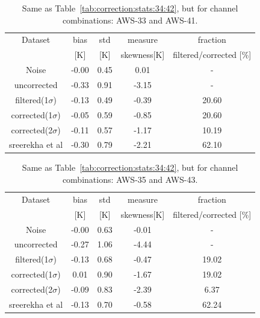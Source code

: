 \documentclass[12pt]{article}
\begin{document}
\begin{table}[!bt]
	\centering
	\begin{tabular}[b]{c|c|c|c|c}
		Dataset  		  &   bias &   std &   measure  & fraction\\
		&   [K]  &   [K] & skewness[K]                   & filtered/corrected [\%]\\
		\hline
	Noise             &  -0.00 &  0.45 &               0.01 &               - \\
	uncorrected       &  -0.33 &  0.91 &              -3.15 &                - \\
	filtered(1$\sigma$)  &  -0.13 &  0.49 &              -0.39 &               20.60 \\
	corrected(1$\sigma$) &  -0.05 &  0.59 &              -0.85 &               20.60 \\
	corrected(2$\sigma$) &  -0.11 &  0.57 &              -1.17 &               10.19 \\
	sreerekha et al   &  -0.30 &  0.79 &              -2.21 &               62.10 \\
		\hline
	\end{tabular}
	\caption{Same as Table~\ref{tab:correction:stats:34:42}, but for channel combinations: AWS-33 and AWS-41.   }
	\label{tab:correction:stats:33:41}
\end{table}

\begin{table}[!bt]
	\centering
	\begin{tabular}[b]{c|c|c|c|c}
		Dataset  		  &   bias &   std &   measure & fraction \\
		&   [K]  &   [K] & skewness[K] & filtered/corrected [\%]\\
		\hline
 Noise             &  -0.00 &  0.63 &              -0.01 &                - \\
uncorrected       &  -0.27 &  1.06 &              -4.44 &                - \\
filtered(1$\sigma$)  &  -0.13 &  0.68 &              -0.47 &               19.02 \\
corrected(1$\sigma$) &   0.01 &  0.90 &              -1.67 &               19.02 \\
corrected(2$\sigma$) &  -0.09 &  0.83 &              -2.39 &                6.37 \\
sreerekha et al   &  -0.13 &  0.70 &              -0.58 &               62.24 \\
		\hline
	\end{tabular}
	\caption{Same as Table~\ref{tab:correction:stats:34:42}, but for channel combinations: AWS-35 and AWS-43.   }
	\label{tab:correction:stats:35:43}
\end{table}
\end{document}

